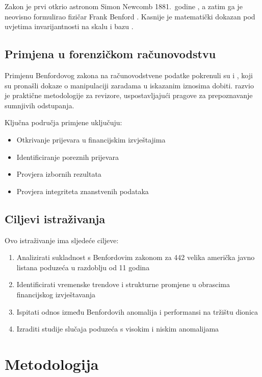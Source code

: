 \documentclass[12pt,a4paper]{article}
\begin{document}
Zakon je prvi otkrio astronom Simon Newcomb 1881.\ godine \citep{newcomb1881}, a zatim ga je neovisno formulirao fizičar Frank Benford \citep{benford1938}. Kasnije je matematički dokazan pod uvjetima invarijantnosti na skalu i bazu \citep{hill1995}.

\subsection{Primjena u forenzičkom računovodstvu}

Primjenu Benfordovog zakona na računovodstvene podatke pokrenuli su \citet{carslaw1988} i \citet{thomas1989}, koji su pronašli dokaze o manipulaciji zaradama u iskazanim iznosima dobiti. \citet{nigrini1996, nigrini1999} razvio je praktične metodologije za revizore, uspostavljajući pragove za prepoznavanje sumnjivih odstupanja.

Ključna područja primjene uključuju:
\begin{itemize}
    \item Otkrivanje prijevara u financijskim izvještajima
    \item Identificiranje poreznih prijevara
    \item Provjera izbornih rezultata
    \item Provjera integriteta znanstvenih podataka
\end{itemize}

\subsection{Ciljevi istraživanja}

Ovo istraživanje ima sljedeće ciljeve:
\begin{enumerate}
    \item Analizirati sukladnost s Benfordovim zakonom za 442 velika američka javno listana poduzeća u razdoblju od 11 godina
    \item Identificirati vremenske trendove i strukturne promjene u obrascima financijskog izvještavanja
    \item Ispitati odnos između Benfordovih anomalija i performansi na tržištu dionica
    \item Izraditi studije slučaja poduzeća s visokim i niskim anomalijama
\end{enumerate}

\newpage
\section{Metodologija}
\end{document}
